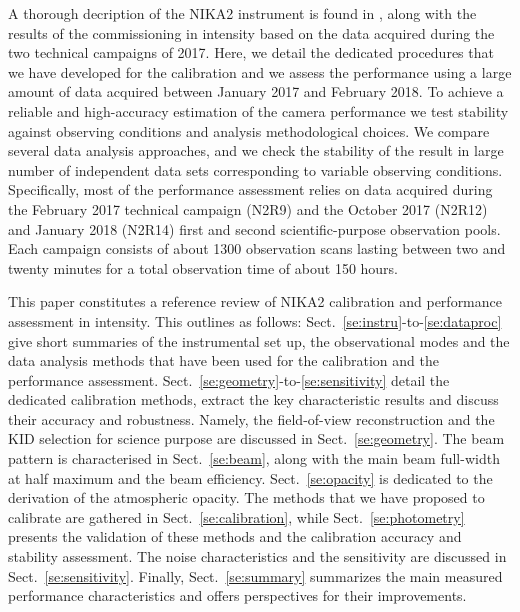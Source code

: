 A thorough decription of the NIKA2 instrument is found in \citet{Adam2017},
along with the results of the commissioning in intensity based on the
data acquired during the two technical campaigns of 2017. Here, we
detail the dedicated procedures that we have developed for the
calibration and we assess the performance using a large amount of
data acquired between January 2017 and February 2018.
To achieve a reliable and high-accuracy estimation
of the camera performance we test stability
against observing conditions and analysis
 methodological choices. We compare several data analysis approaches,
and we check the stability of the result in large number of
independent data sets corresponding to variable observing conditions.
Specifically, most of the performance assessment relies on data
acquired during the February 2017 technical campaign (N2R9) and the
October 2017 (N2R12) and January 2018 (N2R14) first and second
scientific-purpose observation pools. Each campaign consists of about
1300 observation scans lasting between two and twenty minutes for a
total observation time of about 150 hours.

This paper constitutes a reference review of NIKA2 calibration and
performance assessment in intensity. This outlines as follows:
Sect.~\ref{se:instru}-to-\ref{se:dataproc} give short summaries of the
instrumental set up, the observational modes and the data analysis methods
that have been used for the calibration and the performance
assessment. Sect.~\ref{se:geometry}-to-\ref{se:sensitivity} detail the
dedicated calibration methods, extract the key characteristic results
and discuss their accuracy and robustness. Namely, the field-of-view
reconstruction and the KID selection for science purpose are discussed
in Sect.~\ref{se:geometry}. The beam pattern is characterised in
Sect.~\ref{se:beam}, along with the main beam
full-width at half maximum and the beam
efficiency. Sect.~\ref{se:opacity} is dedicated to the derivation of
the atmospheric opacity. The methods that we have proposed to
calibrate are gathered in Sect.~\ref{se:calibration}, while
Sect.~\ref{se:photometry} presents the validation of these methods and
the calibration accuracy and stability assessment. The noise
characteristics and the sensitivity are discussed in
Sect.~\ref{se:sensitivity}. Finally, Sect.~\ref{se:summary} summarizes
the main measured performance characteristics and offers perspectives
for their improvements. 















